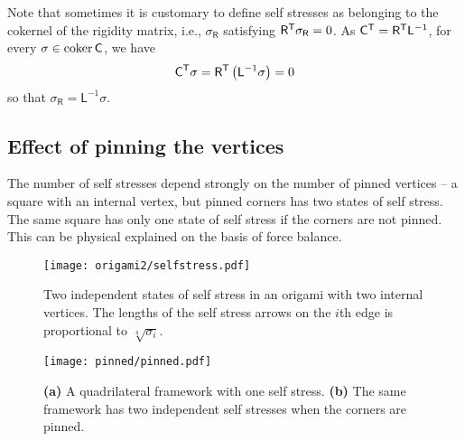 Note that sometimes it is customary to define self stresses as belonging to the cokernel of the rigidity matrix, i.e., $\sigma_{\mathsf{R}}$ satisfying $\mathsf{R}^\mathsf{T}\sigma_{\mathsf{R}} = 0$.
As $\mathsf{C}^\mathsf{T} = \mathsf{R}^\mathsf{T}\mathsf{L}^{-1}$, for every $\sigma \in \operatorname{coker}\mathsf{C}$, we have
%
\begin{equation}
  \mathsf{C}^\mathsf{T}\sigma = \mathsf{R}^\mathsf{T}\left(\mathsf{L}^{-1}\mathsf{\sigma}\right) = 0
\end{equation}
%
so that $\sigma_{\mathsf{R}} = \mathsf{L}^{-1}\sigma$.

\subsection{Effect of pinning the vertices}

The number of self stresses depend strongly on the number of pinned vertices -- a square with an internal vertex, but pinned corners has two states of self stress.  The same square has only one state of self stress if the corners are not pinned.
This can be physical explained on the basis of force balance.

\begin{figure}
  \begin{center}
    \texttt{[image: origami2/selfstress.pdf]}
  \end{center}
  \caption{
    Two independent states of self stress in an origami with two internal vertices.
    The lengths of the self stress arrows on the $i$th edge is proportional to $\sqrt[4]{\sigma_{i}}$.
  }
  \label{fig:origami2_selfstress}
\end{figure}
%
\begin{figure}
  \begin{center}
    \texttt{[image: pinned/pinned.pdf]}
  \end{center}
  \caption{
    \textsf{\textbf{(a)}} A quadrilateral framework with one self stress.
    \textsf{\textbf{(b)}} The same framework has two independent self stresses when the corners are pinned.
  }
  \label{fig:quad_pinned}
\end{figure}
